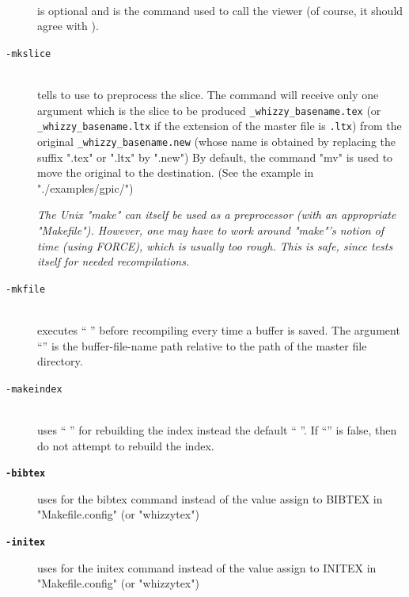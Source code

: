 \documentclass[12pt]{article}
\begin{document}
\begin{description}
\begin{description}
\item[]\indent\\
is optional and is the command used to call the viewer
(of course, it should agree with ).

\item[\texttt{-mkslice} ]\indent\\
tells {\whizzy} to use   to preprocess the slice.
The command  will receive only one argument
which is the slice to be produced \texttt{\_whizzy\_basename.tex}
(or \texttt{\_whizzy\_basename.ltx} if the extension of the master file is
\texttt{.ltx}) from the original \texttt{\_whizzy\_basename.new}
(whose name is obtained by replacing the suffix ".tex" or ".ltx" by ".new")
By default, the command \lst"mv" is  used to move the original to the
destination. (See the example in \lst"./examples/gpic/")

{\em The Unix \lst"make"  can itself be used as a preprocessor (with an
appropriate \lst"Makefile").  However, one may have to work around
\lst"make"'s notion of time (using FORCE), which is usually too rough.
This is safe, since {\whizzy} tests itself for needed recompilations.}

\item[\texttt{-mkfile} ]\indent\\
executes `` '' before recompiling every time a
buffer is saved. The argument ``'' is the buffer-file-name
path relative to the path of the master file directory.

\item[\texttt{-makeindex} ]\indent\\
uses `` '' for rebuilding the index instead
the default `` ''.  If ``'' is
false, then do not attempt to rebuild the index.

\item[{\bf {\tt -bibtex }}]\indent

uses  for the bibtex command instead of the value
assign to BIBTEX in \lst"Makefile.config" (or \lst"whizzytex")

\item[{\bf {\tt -initex }}]\indent

uses  for the initex command instead of the value
assign to INITEX in \lst"Makefile.config" (or \lst"whizzytex")


\end{description}
\end{description}
\end{document}
